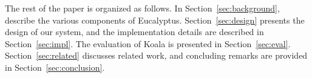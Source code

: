 The rest of the paper is organized as follows.  In Section~\ref{sec:background}, describe the various components of Eucalyptus.  Section~\ref{sec:design} presents the design of our system, and the implementation details are described in Section~\ref{sec:impl}.  The evaluation of Koala is presented in Section~\ref{sec:eval}.  Section~\ref{sec:related} discusses related work, and concluding remarks are provided in Section~\ref{sec:conclusion}.%


